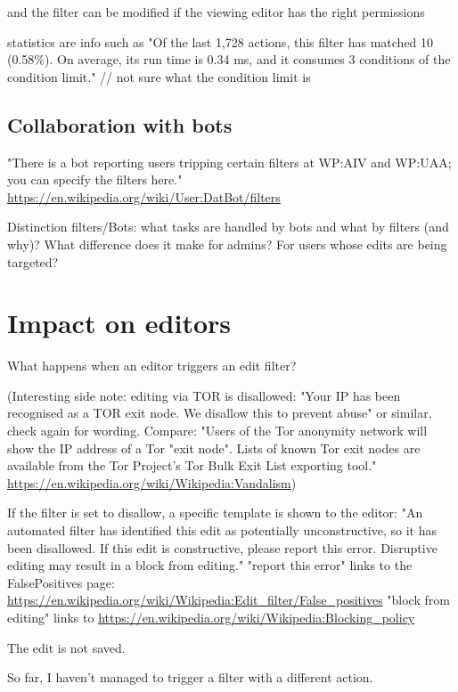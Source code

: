 \documentclass{sigchi}
\begin{document}
and the filter can be modified if the viewing editor has the right permissions

statistics are info such as "Of the last 1,728 actions, this filter has matched 10 (0.58\%). On average, its run time is 0.34 ms, and it consumes 3 conditions of the condition limit." // not sure what the condition limit is

\subsection{Collaboration with bots}

"There is a bot reporting users tripping certain filters at WP:AIV and WP:UAA; you can specify the filters here."
\url{https://en.wikipedia.org/wiki/User:DatBot/filters}

Distinction filters/Bots: what tasks are handled by bots and what by filters (and why)? What difference does it make for admins? For users whose edits are being targeted?


\section{Impact on editors}

What happens when an editor triggers an edit filter?

(Interesting side note: editing via TOR is disallowed: "Your IP has been recognised as a TOR exit node. We disallow this to prevent abuse" or similar, check again for wording. Compare: "Users of the Tor anonymity network will show the IP address of a Tor "exit node". Lists of known Tor exit nodes are available from the Tor Project's Tor Bulk Exit List exporting tool." \url{https://en.wikipedia.org/wiki/Wikipedia:Vandalism})

If the filter is set to disallow, a specific template is shown to the editor: "An automated filter has identified this edit as potentially unconstructive, so it has been disallowed. If this edit is constructive, please report this error. Disruptive editing may result in a block from editing."
"report this error" links to the FalsePositives page: \url{https://en.wikipedia.org/wiki/Wikipedia:Edit_filter/False_positives}
"block from editing" links to \url{https://en.wikipedia.org/wiki/Wikipedia:Blocking_policy}

The edit is not saved.

So far, I haven't managed to trigger a filter with a different action.
\end{document}
